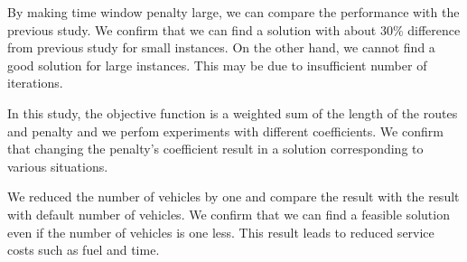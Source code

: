 By making time window penalty large, we can compare the performance with the previous study. We confirm that we can find a solution with about 30\% difference from previous study for small instances. On the other hand, we cannot find a good solution for large instances. This may be due to insufficient number of iterations.

In this study, the objective function is a weighted sum of the length of the routes and penalty and we perfom experiments with different coefficients.
We confirm that changing the penalty's coefficient result in a solution corresponding to various situations.

We reduced the number of vehicles by one and compare the result with the result with default number of vehicles. We confirm that we can find a feasible solution even if the number of vehicles is one less.
This result leads to reduced service costs such as fuel and time.
